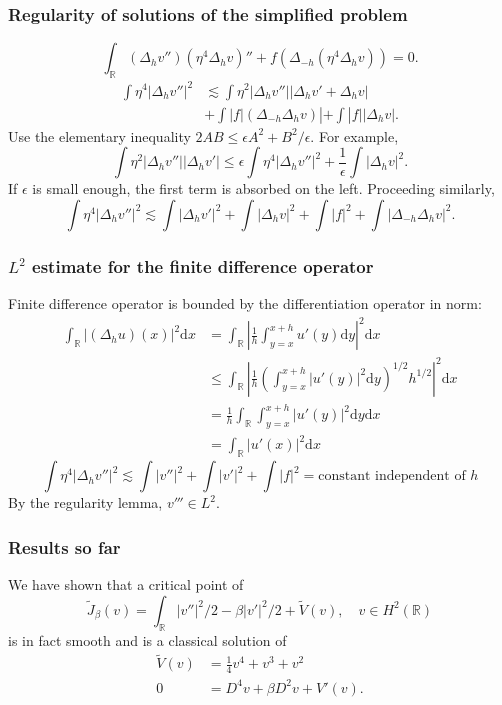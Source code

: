 \documentclass[9pt, english]{beamer}
\theoremstyle{definition}
\newcommand{\R}{\mathbb{R}}                     %
\begin{document}
\begin{frame}
\frametitle{Regularity of solutions of the simplified problem}
\[
\int_\R (\Delta_h v'') (\eta^4 \Delta_h v)'' + f (\Delta_{-h}
(\eta^4 \Delta_h v)) = 0.
\]
\begin{align*}
\int \eta^4 |\Delta_h v''|^2 &\lesssim
\int \eta^2 |\Delta_h v''| |\Delta_h v' + \Delta_h v|\\
&+ \int |f| (\Delta_{-h}\Delta_h v)| + \int |f| |\Delta_h v |.
\end{align*}
\pause Use the elementary inequality $2AB \leq \epsilon A^2 +
B^2/\epsilon$. For example,
\[
\int \eta^2 |\Delta_h v''| |\Delta_h v'| \leq \epsilon \int \eta^4
|\Delta_h v''|^2 + \frac1\epsilon \int |\Delta_h v|^2.
\]
\pause If $\epsilon$ is small enough, the first term is absorbed on
the left. Proceeding similarly,
\[
\int \eta^4 |\Delta_h v''|^2 \lesssim \int |\Delta_h v'|^2 + \int
|\Delta_h v|^2 + \int |f|^2 + \int |\Delta_{-h}\Delta_h v|^2.
\]
\end{frame}

\begin{frame}
\frametitle{$L^2$ estimate for the finite difference operator}
\newcommand{\dif}{\text{d}}
Finite difference operator is bounded by the differentiation
operator in norm:
\begin{align*}
\int_\R |(\Delta_h u)(x)|^2 \dif x &= \int_\R \left| \frac{1}{h}
\int_{y=x}^{x+h} u'(y) \dif y
\right|^2 \dif x\\
&\leq \int_\R \left| \frac{1}{h} \left(\int_{y=x}^{x+h} |u'(y)|^2
\dif y \right)^{1/2} h^{1/2}
\right|^2 \dif x\\
&= \frac{1}{h} \int_\R \int_{y=x}^{x+h} |u'(y)|^2 \dif y
\dif x\\
&= \int_\R |u'(x)|^2 \dif x
\end{align*}
\pause
\[
\int \eta^4 |\Delta_h v''|^2 \lesssim \int |v''|^2 + \int |v'|^2 +
\int |f|^2 = \text{constant independent of } h
\]
By the regularity lemma, $v''' \in L^2$.
\end{frame}

\begin{frame}
\frametitle{Results so far} We have shown that a critical point of
\[
\tilde J_\beta(v) = \int_\R |v''|^2 / 2 - \beta |v'|^2 / 2 + \tilde
V(v), \quad v \in H^2(\R)
\]
is in fact smooth and is a classical solution of
\begin{align*}
\tilde V(v) &= \frac14 v^4 + v^3 + v^2\\
0 &= D^4 v + \beta D^2 v + V'(v).
\end{align*}
\end{frame}
\end{document}
